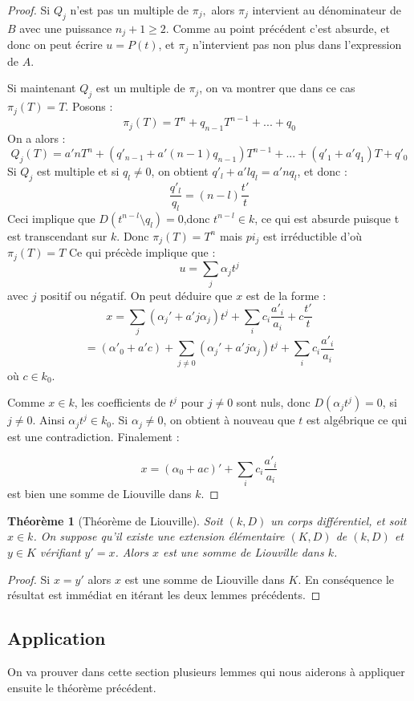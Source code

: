 \documentclass[12pt,a4paper]{report}
\newtheorem{thm}{\bf Th\'eor\`eme}
\begin{document}
\begin{proof}
Si $Q_{j}$ n'est pas un multiple de $\pi_{j},$ alors $\pi_{j}$ intervient au dénominateur de $B$ avec une puissance $n_{j}+1 \geq 2$. Comme au point précédent c'est absurde, et donc on peut écrire $u=P(t)$, et $\pi_{j}$ n'intervient pas non plus dans l'expression de $A$. 

Si maintenant $Q_{j}$ est un multiple de $\pi_{j}$, on va montrer que dans ce cas $\pi_{j}(T)=T. $ Posons : 
$$\pi_{j}(T)=T^{n}+q_{n-1}T^{n-1}+...+q_{0}$$
On a alors : 
$$Q_{j}(T)=a'nT^{n}+(q'_{n-1}+a'(n-1)q_{n-1})T^{n-1}+...+(q'_{1}+a'q_{1})T+q'_{0}$$
Si $Q_{j}$ est multiple et si $q_{l}\neq 0$, on obtient $q'_{l}+a'lq_{l}=a'nq_{l}$, et donc :
$$ \dfrac{q'_{l}}{q_{l}}=(n-l)\dfrac{t'}{t}$$
Ceci implique que $D(t^{n-l}\setminus q_{l})=0$,donc $t^{n-l}\in k$, ce qui est absurde puisque t est transcendant sur $k$. Donc $\pi_{j}(T)=T^{n}$ mais $pi_{j}$ est irréductible d'où $\pi_{j}(T)=T$
Ce qui précède implique que : 
$$u=\sum_{j}\alpha_{j}t^{j}$$
avec $j$ positif ou négatif. On peut déduire que $x$ est de la forme : 
$$x=\sum_{j}(\alpha_{j}'+a'j\alpha_{j})t^{j}+\sum_{i}c_{i}\dfrac{a'_{i}}{a_{i}}+c\dfrac{t'}{t}$$
$$=(\alpha'_{0}+a'c) + \sum_{j\neq 0}(\alpha_{j}'+a'j\alpha_{j})t^{j}+\sum_{i}c_{i}\dfrac{a'_{i}}{a_{i}}$$
où $c\in k_{0}$.

Comme $x\in k$, les coefficients de $t^{j}$ pour $j\neq 0$ sont nuls, donc $D(\alpha_{j}t^{j})=0$, si $j\neq 0$. Ainsi $\alpha_{j}t^{j}\in k_{0}$. Si $\alpha_{j}\neq 0$, on obtient à nouveau que $t$ est algébrique ce qui est une contradiction. Finalement : 

$$x=(\alpha_{0}+ac)'+\sum_{i}c_{i}\dfrac{a'_{i}}{a_{i}}$$
est bien une somme de Liouville dans $k$. 

\end{proof}

\begin{thm}[Théorème de Liouville]\rm
Soit $(k,D)$ un corps différentiel, et soit $x\in k$. On suppose qu'il existe une extension élémentaire $(K,D)$ de $(k,D)$ et $y\in K$ vérifiant $y'=x$. Alors $x$ est une somme de Liouville dans $k$.

\end{thm}

\begin{proof}
Si $x=y'$ alors $x$ est une somme de Liouville dans $K$. En conséquence le résultat est immédiat en itérant les deux lemmes précédents. 
\end{proof}

\subsection{Application}
On va prouver dans cette section plusieurs lemmes qui nous aiderons à appliquer ensuite le théorème précédent. 
\end{document}
